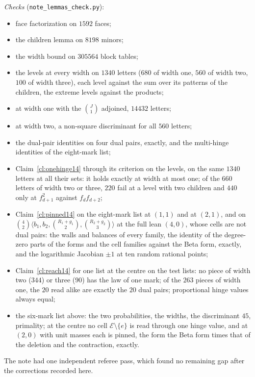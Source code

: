 \documentclass[11pt]{article}
\newcommand{\cE}{\mathcal E}
\theoremstyle{plain}
\theoremstyle{remark}
\begin{document}
\emph{Checks} (\texttt{note\_lemmas\_check.py}):
\begin{itemize}
\item face factorization on $1592$ faces;
\item the children lemma on $8198$ minors;
\item the width bound on $305564$ block tables;
\item the levels at every width on $1340$ letters ($680$ of width one, $560$ of width two, $100$ of width three), each level against the sum over its patterns of the children, the extreme levels against the products;
\item at width one with the $\binom J1$ adjoined, $14432$ letters;
\item at width two, a non-square discriminant for all $560$ letters;
\item the dual-pair identities on four dual pairs, exactly, and the multi-hinge identities of the eight-mark list;
\item Claim~\ref{cl:onehinge14} through its criterion on the levels, on the same $1340$ letters at all their sets: it holds exactly at width at most one; of the $660$ letters of width two or three, $220$ fail at a level with two children and $440$ only at $f_{d+1}^2$ against $f_df_{d+2}$;
\item Claim~\ref{cl:pinned14} on the eight-mark list at $(1,1)$ and at $(2,1)$, and on $\binom42\langle b_1,b_2,\binom{R_1+g_1}2,\binom{R_2+g_2}3\rangle$ at the full lean $(4,0)$, whose cells are not dual pairs: the walls and balances of every family, the identity of the degree-zero parts of the forms and the cell families against the Beta form, exactly, and the logarithmic Jacobian $\pm1$ at ten random rational points;
\item Claim~\ref{cl:reach14} for one list at the centre on the test lists: no piece of width two ($344$) or three ($90$) has the law of one mark; of the $263$ pieces of width one, the $20$ read alike are exactly the $20$ dual pairs; proportional hinge values always equal;
\item the six-mark list above: the two probabilities, the widths, the discriminant $45$, primality; at the centre no cell $\cE\setminus\{e\}$ is read through one hinge value, and at $(2,0)$ with unit masses each is pinned, the form the Beta form times that of the deletion and the contraction, exactly.
\end{itemize}
The note had one independent referee pass, which found no remaining gap after the corrections recorded here.
\end{document}
